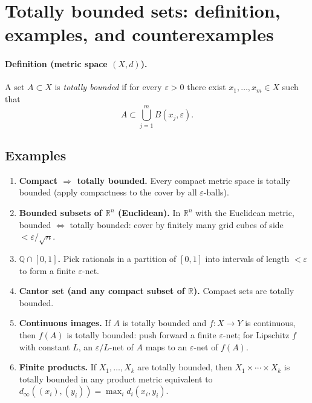 \documentclass[12pt,a4paper]{article}
\begin{document}
\section*{Totally bounded sets: definition, examples, and counterexamples}

\paragraph{Definition (metric space $(X,d)$).}
A set $A\subset X$ is \emph{totally bounded} if for every $\varepsilon>0$ there exist
$x_1,\dots,x_m\in X$ such that
\[
A \subset \bigcup_{j=1}^m B(x_j,\varepsilon).
\]

\subsection*{Examples}
\begin{enumerate}
	\item \textbf{Compact $\Rightarrow$ totally bounded.}
	Every compact metric space is totally bounded (apply compactness to the cover by all $\varepsilon$-balls).
	
	\item \textbf{Bounded subsets of $\mathbb{R}^n$ (Euclidean).}
	In $\mathbb{R}^n$ with the Euclidean metric, bounded $\Leftrightarrow$ totally bounded:
	cover by finitely many grid cubes of side $<\varepsilon/\sqrt n$.
	
	\item \textbf{$\mathbb{Q}\cap[0,1]$.}
	Pick rationals in a partition of $[0,1]$ into intervals of length $<\varepsilon$ to form a finite $\varepsilon$-net.
	
	\item \textbf{Cantor set (and any compact subset of $\mathbb{R}$).}
	Compact sets are totally bounded.
	
	\item \textbf{Continuous images.}
	If $A$ is totally bounded and $f:X\to Y$ is continuous, then $f(A)$ is totally bounded:
	push forward a finite $\varepsilon$-net; for Lipschitz $f$ with constant $L$, an
	$\varepsilon/L$-net of $A$ maps to an $\varepsilon$-net of $f(A)$.
	
	\item \textbf{Finite products.}
	If $X_1,\dots,X_k$ are totally bounded, then $X_1\times\cdots\times X_k$ is totally bounded
	in any product metric equivalent to $d_\infty((x_i),(y_i))=\max_i d_i(x_i,y_i)$.
\end{enumerate}
\end{document}
